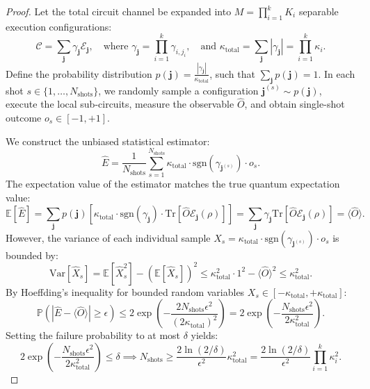 \begin{proof}
Let the total circuit channel be expanded into $M = \prod_{i=1}^k K_i$ separable execution configurations:
\begin{equation}
    \mathcal{C} = \sum_{\bm{j}} \gamma_{\bm{j}} \mathcal{E}_{\bm{j}}, \quad \text{where } \gamma_{\bm{j}} = \prod_{i=1}^k \gamma_{i, j_i}, \quad \text{and } \kappa_{\text{total}} = \sum_{\bm{j}} |\gamma_{\bm{j}}| = \prod_{i=1}^k \kappa_i.
\end{equation}
Define the probability distribution $p(\bm{j}) = \frac{|\gamma_{\bm{j}}|}{\kappa_{\text{total}}}$, such that $\sum_{\bm{j}} p(\bm{j}) = 1$. In each shot $s \in \{1, \dots, N_{\text{shots}}\}$, we randomly sample a configuration $\bm{j}^{(s)} \sim p(\bm{j})$, execute the local sub-circuits, measure the observable $\hat{O}$, and obtain single-shot outcome $o_s \in [-1, +1]$. 

We construct the unbiased statistical estimator:
\begin{equation}
    \hat{E} = \frac{1}{N_{\text{shots}}} \sum_{s=1}^{N_{\text{shots}}} \kappa_{\text{total}} \cdot \text{sgn}\left(\gamma_{\bm{j}^{(s)}}\right) \cdot o_s.
\end{equation}
The expectation value of the estimator matches the true quantum expectation value:
\begin{equation}
    \mathbb{E}[\hat{E}] = \sum_{\bm{j}} p(\bm{j}) \left[ \kappa_{\text{total}} \cdot \text{sgn}(\gamma_{\bm{j}}) \cdot \text{Tr}[\hat{O} \mathcal{E}_{\bm{j}}(\rho)] \right] = \sum_{\bm{j}} \gamma_{\bm{j}} \text{Tr}[\hat{O} \mathcal{E}_{\bm{j}}(\rho)] = \langle \hat{O} \rangle.
\end{equation}
However, the variance of each individual sample $\hat{X}_s = \kappa_{\text{total}} \cdot \text{sgn}(\gamma_{\bm{j}^{(s)}}) \cdot o_s$ is bounded by:
\begin{equation}
    \text{Var}[\hat{X}_s] = \mathbb{E}[\hat{X}_s^2] - (\mathbb{E}[\hat{X}_s])^2 \le \kappa_{\text{total}}^2 \cdot 1^2 - \langle \hat{O} \rangle^2 \le \kappa_{\text{total}}^2.
\end{equation}
By Hoeffding's inequality for bounded random variables $X_s \in [-\kappa_{\text{total}}, +\kappa_{\text{total}}]$:
\begin{equation}
    \mathbb{P}\left( \left| \hat{E} - \langle \hat{O} \rangle \right| \ge \epsilon \right) \le 2 \exp\left( -\frac{2 N_{\text{shots}} \epsilon^2}{(2 \kappa_{\text{total}})^2} \right) = 2 \exp\left( -\frac{N_{\text{shots}} \epsilon^2}{2 \kappa_{\text{total}}^2} \right).
\end{equation}
Setting the failure probability to at most $\delta$ yields:
\begin{equation}
    2 \exp\left( -\frac{N_{\text{shots}} \epsilon^2}{2 \kappa_{\text{total}}^2} \right) \le \delta \implies N_{\text{shots}} \ge \frac{2 \ln(2/\delta)}{\epsilon^2} \kappa_{\text{total}}^2 = \frac{2 \ln(2/\delta)}{\epsilon^2} \prod_{i=1}^k \kappa_i^2.
\end{equation}
\end{proof}

